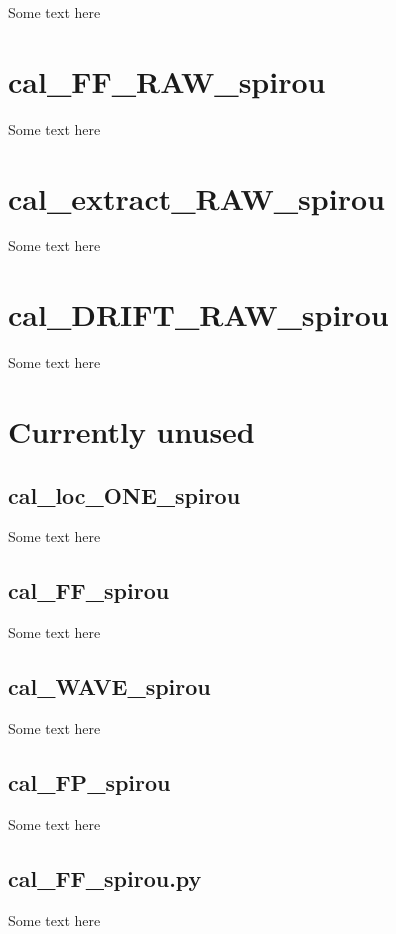 Some text here

\section{cal\_FF\_RAW\_spirou}
\label{section:cal_FF_RAW_spirou}

Some text here

\section{cal\_extract\_RAW\_spirou}
\label{section:cal_extract_RAW_spirou}

Some text here

\section{cal\_DRIFT\_RAW\_spirou}
\label{section:cal_DRIFT_RAW_spirou}

Some text here

\section{Currently unused}

\subsection{cal\_loc\_ONE\_spirou}

Some text here

\subsection{cal\_FF\_spirou}

Some text here

\subsection{cal\_WAVE\_spirou}

Some text here

\subsection{cal\_FP\_spirou}

Some text here

\subsection{cal\_FF\_spirou.py}

Some text here

